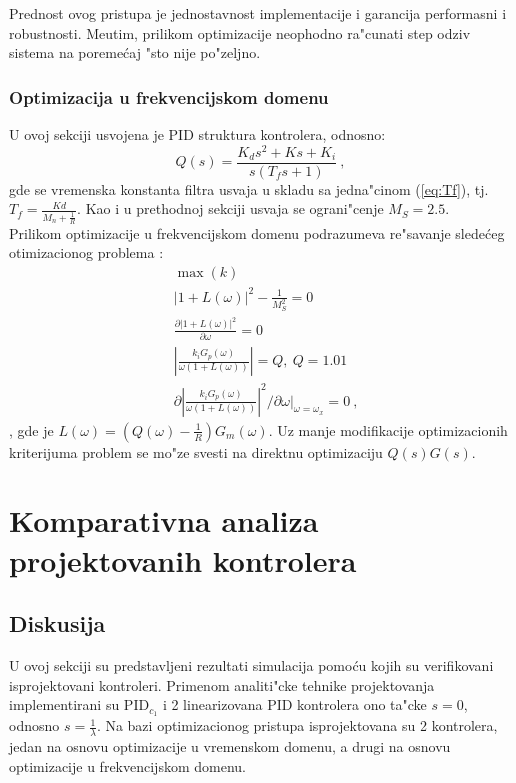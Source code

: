 \documentclass[a4paper,11pt]{article}
\theoremstyle{definition} \newtheorem{deff}{Definicija}[section]
\theoremstyle{definition} \newtheorem{prim}[deff]{Primer}
\theoremstyle{plain} \newtheorem{teor}[deff]{Teorema}
\begin{document}
	Prednost ovog pristupa je jednostavnost implementacije i garancija performasni i robustnosti. Me\dj{}utim, prilikom optimizacije neophodno ra"cunati step odziv sistema na poreme\'caj "sto nije po"zeljno. 
	
	\subsubsection{Optimizacija u frekvencijskom domenu} \label{sec:opt_fr}
	
	
	U ovoj sekciji usvojena je PID struktura kontrolera, odnosno:
	\begin{equation}
		Q(s) = \frac{K_ds^2 + Ks+K_i}{s(T_fs+1)}~, 
	\end{equation}
	gde se vremenska konstanta filtra usvaja u skladu sa jedna"cinom (\ref{eq:Tf}), tj. $T_f = \frac{Kd}{M_n+\frac{1}{R}}$. Kao i u prethodnoj sekciji usvaja se ograni"cenje $M_S = 2.5$.\\
	
	Prilikom optimizacije u frekvencijskom domenu podrazumeva re"savanje slede\'ceg otimizacionog problema \cite{frekvencijski_opt}: 
	\begin{align}
		&\operatorname{max} (k)\\
		&|1+L(\omega)|^2 - \frac{1}{M^2_S} = 0\\
		&\frac{\partial |1+L(\omega)|^2}{\partial \omega} = 0\\
		& |\frac{k_iG_p(\omega)}{\omega(1+L(\omega))}| = Q,~Q=1.01\\
		&\partial |\frac{k_iG_p(\omega)}{\omega(1+L(\omega))}|^2 / \partial \omega |_{\omega=\omega_x} = 0~, 
	\end{align}, 
	gde je $L(\omega) = (Q(\omega) - \frac{1}{R})G_m(\omega)$. Uz manje modifikacije optimizacionih kriterijuma problem se mo"ze svesti na direktnu optimizaciju $Q(s)G(s)$. 
	
	
	
	

	
	
	\newpage
	
	
	\section{Komparativna analiza projektovanih kontrolera} \label{sec:comp}
	\subsection{Diskusija}
	
	U ovoj sekciji su predstavljeni rezultati simulacija pomo\'cu kojih su verifikovani isprojektovani kontroleri. Primenom analiti"cke tehnike projektovanja implementirani su PID$_{c_1}$ i 2 linearizovana PID kontrolera ono ta"cke $s = 0$, odnosno $s = \frac{1}{\lambda}$. Na bazi optimizacionog pristupa isprojektovana su 2 kontrolera, jedan na osnovu optimizacije u vremenskom domenu, a drugi na osnovu optimizacije u frekvencijskom domenu.\\ 
	
\end{document}
